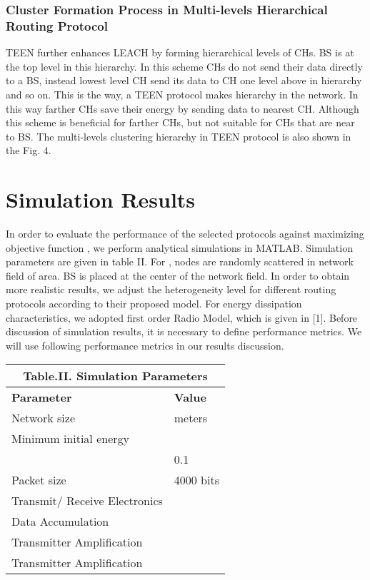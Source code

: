\documentclass[journal]{IEEEtran}
\begin{document}
{\subsubsection{Cluster Formation Process in Multi-levels Hierarchical Routing Protocol}
TEEN further enhances LEACH by forming hierarchical levels of CHs. BS is at the top level in this hierarchy.  In this scheme CHs do not send their data directly to a BS, instead lowest level CH send its data to CH one level above in hierarchy and so on. This is the way, a TEEN protocol makes hierarchy in the network. In this way farther CHs save their energy by sending data to nearest CH. Although this scheme is beneficial for farther CHs, but not suitable for CHs that are near to BS. The multi-levels clustering hierarchy in TEEN protocol is also shown in the Fig. 4.



\section{Simulation Results}
In order to evaluate the performance of the selected protocols against maximizing objective function , we perform analytical simulations in MATLAB. Simulation parameters are given in table II. For ,  nodes are randomly scattered in network field of  area. BS is placed at the center of the network field. In order to obtain more realistic results, we adjust the heterogeneity level for different routing protocols according to their proposed model. For energy dissipation characteristics, we adopted first order Radio Model, which is given in [1]. Before discussion of simulation results, it is necessary to define performance metrics. We will use following performance metrics in our results discussion.

\begin{table}[h]
\begin {center}
\begin{tabular}{|p{3.25cm}|p{3.25cm}|}
\multicolumn{2}{c}{Table.II. Simulation Parameters} \\
\hline
\textbf{Parameter}&\textbf{Value} \\ \hline
 Network size& meters\\ \hline
Minimum initial energy& \\ \hline
 &0.1 \\ \hline
Packet size&4000 bits\\ \hline
Transmit/ Receive Electronics& \\ \hline
Data Accumulation&  \\ \hline
Transmitter Amplification & \\ \hline
Transmitter Amplification & \\ \hline
\end{tabular}
\end{center}
\end{table}

}
\end{document}
